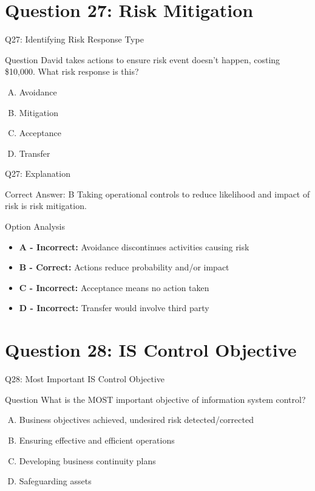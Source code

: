 \documentclass{beamer}
\begin{document}
	\section{Question 27: Risk Mitigation}
	
	\begin{frame}{Q27: Identifying Risk Response Type}
		\begin{block}{Question}
			David takes actions to ensure risk event doesn't happen, costing \$10,000. What risk response is this?
		\end{block}
		\begin{enumerate}[(A)]
			\item Avoidance
			\item Mitigation
			\item Acceptance
			\item Transfer
		\end{enumerate}
	\end{frame}
	
	\begin{frame}{Q27: Explanation}
		\begin{block}{Correct Answer: B}
			Taking operational controls to reduce likelihood and impact of risk is risk mitigation.
		\end{block}
		\begin{block}{Option Analysis}
			\begin{itemize}
				\item \textbf{A - Incorrect:} Avoidance discontinues activities causing risk
				\item \textbf{B - Correct:} Actions reduce probability and/or impact
				\item \textbf{C - Incorrect:} Acceptance means no action taken
				\item \textbf{D - Incorrect:} Transfer would involve third party
			\end{itemize}
		\end{block}
	\end{frame}
	
	\section{Question 28: IS Control Objective}
	
	\begin{frame}{Q28: Most Important IS Control Objective}
		\begin{block}{Question}
			What is the MOST important objective of information system control?
		\end{block}
		\begin{enumerate}[(A)]
			\item Business objectives achieved, undesired risk detected/corrected
			\item Ensuring effective and efficient operations
			\item Developing business continuity plans
			\item Safeguarding assets
		\end{enumerate}
	\end{frame}
	
\end{document}
